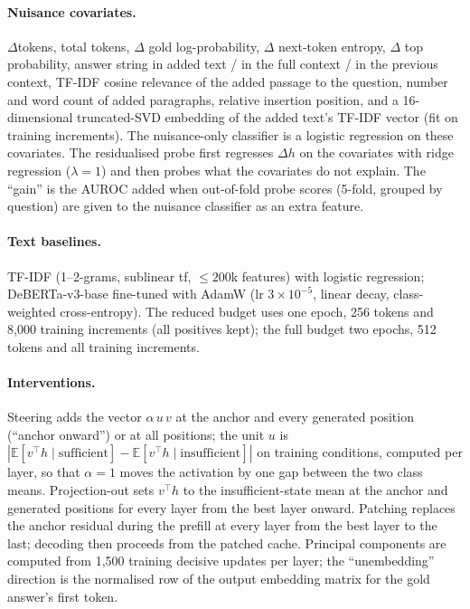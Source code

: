 \paragraph{Nuisance covariates.} $\Delta$tokens, total tokens, $\Delta$ gold log-probability, $\Delta$ next-token entropy, $\Delta$ top probability, answer string in added text / in the full context / in the previous context, TF-IDF cosine relevance of the added passage to the question, number and word count of added paragraphs, relative insertion position, and a 16-dimensional truncated-SVD embedding of the added text's TF-IDF vector (fit on training increments). The nuisance-only classifier is a logistic regression on these covariates. The residualised probe first regresses $\Delta h$ on the covariates with ridge regression ($\lambda=1$) and then probes what the covariates do not explain. The ``gain'' is the AUROC added when out-of-fold probe scores (5-fold, grouped by question) are given to the nuisance classifier as an extra feature.

\paragraph{Text baselines.} TF-IDF (1--2-grams, sublinear tf, $\le200$k features) with logistic regression; DeBERTa-v3-base fine-tuned with AdamW (lr $3{\times}10^{-5}$, linear decay, class-weighted cross-entropy). The reduced budget uses one epoch, 256 tokens and 8{,}000 training increments (all positives kept); the full budget two epochs, 512 tokens and all training increments.

\paragraph{Interventions.} Steering adds the vector $\alpha\,u\,v$ at the anchor and every generated position (``anchor onward'') or at all positions; the unit $u$ is $|\mathbb E[v^\top h\mid\text{sufficient}]-\mathbb E[v^\top h\mid\text{insufficient}]|$ on training conditions, computed per layer, so that $\alpha=1$ moves the activation by one gap between the two class means. Projection-out sets $v^\top h$ to the insufficient-state mean at the anchor and generated positions for every layer from the best layer onward. Patching replaces the anchor residual during the prefill at every layer from the best layer to the last; decoding then proceeds from the patched cache. Principal components are computed from 1{,}500 training decisive updates per layer; the ``unembedding'' direction is the normalised row of the output embedding matrix for the gold answer's first token.
